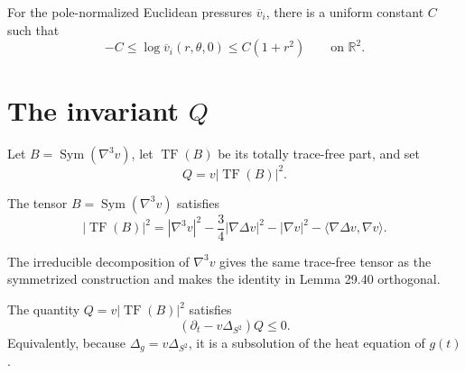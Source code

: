 \begin{lemma}
\label{lem:chow-iv-rescaled-pressure-growth}
For the pole-normalized Euclidean pressures \(\overline v_i\), there is a
uniform constant \(C\) such that
\[
 -C\le\log\overline v_i(r,\theta,0)\le C(1+r^2)
 \qquad\text{on }\mathbb R^2.
\]
\end{lemma}

\section{\texorpdfstring{The invariant \(Q\)}{The invariant Q}}

Let \(B=\operatorname{Sym}(\nabla^3v)\), let
\(\operatorname{TF}(B)\) be its totally trace-free part, and set
\[
 Q=v|\operatorname{TF}(B)|^2.
\]

\begin{lemma}
\label{lem:chow-iv-trace-free-third-derivative}
The tensor \(B=\operatorname{Sym}(\nabla^3v)\) satisfies
\[
 |\operatorname{TF}(B)|^2=|\nabla^3v|^2-\frac34|\nabla\Delta v|^2
 -|\nabla v|^2-\langle\nabla\Delta v,\nabla v\rangle.
\]
\end{lemma}

\begin{remark}
\label{rem:chow-iv-third-derivative-decomposition}
The irreducible decomposition of \(\nabla^3v\) gives the same trace-free
tensor as the symmetrized construction and makes the identity in Lemma 29.40
orthogonal.
\end{remark}

\begin{proposition}
\label{prop:chow-iv-q-heat-subsolution}
The quantity \(Q=v|\operatorname{TF}(B)|^2\) satisfies
\[
 (\partial_t-v\Delta_{S^2})Q\le0.
\]
Equivalently, because \(\Delta_g=v\Delta_{S^2}\), it is a subsolution of
the heat equation of \(g(t)\).
\end{proposition}


